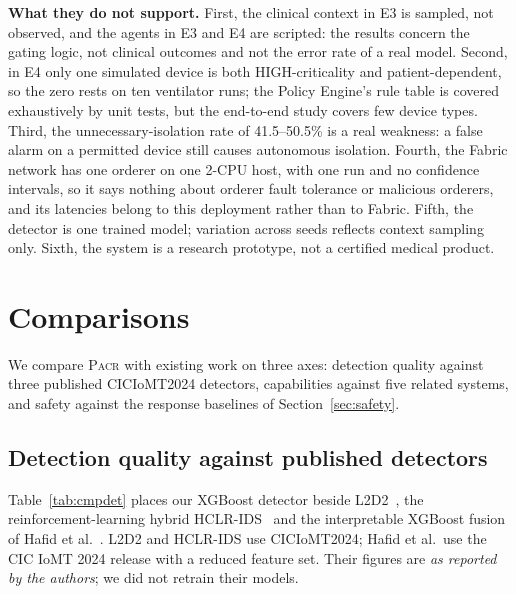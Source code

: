 \documentclass[preprint,12pt]{elsarticle}
\newcommand{\pacr}{\textsc{Pacr}}
\begin{document}
\textbf{What they do not support.} First, the clinical context in E3 is sampled, not observed, and the agents in E3 and E4 are scripted: the results concern the gating logic, not clinical outcomes and not the error rate of a real model. Second, in E4 only one simulated device is both HIGH-criticality and patient-dependent, so the zero rests on ten ventilator runs; the Policy Engine's rule table is covered exhaustively by unit tests, but the end-to-end study covers few device types. Third, the unnecessary-isolation rate of 41.5--50.5\% is a real weakness: a false alarm on a permitted device still causes autonomous isolation. Fourth, the Fabric network has one orderer on one 2-CPU host, with one run and no confidence intervals, so it says nothing about orderer fault tolerance or malicious orderers, and its latencies belong to this deployment rather than to Fabric. Fifth, the detector is one trained model; variation across seeds reflects context sampling only. Sixth, the system is a research prototype, not a certified medical product.

\section{Comparisons}
\label{sec:comparison}

We compare \pacr{} with existing work on three axes: detection quality against three published CICIoMT2024 detectors, capabilities against five related systems, and safety against the response baselines of Section~\ref{sec:safety}.

\subsection{Detection quality against published detectors}
\label{sec:compare-det}
Table~\ref{tab:cmpdet} places our XGBoost detector beside L2D2~\cite{akar2025}, the reinforcement-learning hybrid HCLR-IDS~\cite{shaikh2025} and the interpretable XGBoost fusion of Hafid et al.~\cite{hafid2025}. L2D2 and HCLR-IDS use CICIoMT2024; Hafid et al.\ use the CIC IoMT 2024 release with a reduced feature set. Their figures are \emph{as reported by the authors}; we did not retrain their models.
\end{document}
